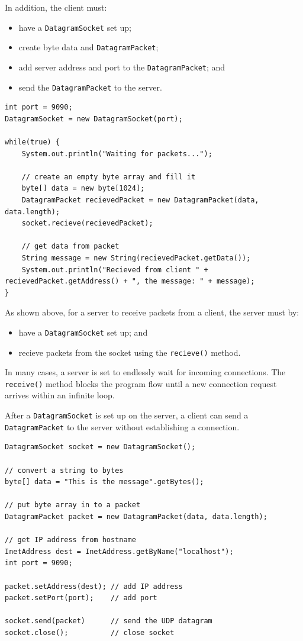 \documentclass[a4paper]{systems-software}
\begin{document}
In addition, the client must:
\begin{itemize}
	\item have a \texttt{DatagramSocket} set up;
	\item create byte data and \texttt{DatagramPacket};
	\item add server address and port to the \texttt{DatagramPacket}; and
	\item send the \texttt{DatagramPacket} to the server.
\end{itemize}


\begin{lstlisting}[title={Server: setting up a DatagramSocket and accepting packets.}]
int port = 9090;
DatagramSocket = new DatagramSocket(port);

while(true) {
	System.out.println("Waiting for packets...");
	
	// create an empty byte array and fill it
	byte[] data = new byte[1024];
	DatagramPacket recievedPacket = new DatagramPacket(data, data.length);
	socket.recieve(recievedPacket);
	
	// get data from packet
	String message = new String(recievedPacket.getData());
	System.out.println("Recieved from client " + recievedPacket.getAddress() + ", the message: " + message);
}
\end{lstlisting}

As shown above, for a server to receive packets from a client, the server must by:
\begin{itemize}
	\item have a \texttt{DatagramSocket} set up; and
	\item recieve packets from the socket using the \texttt{recieve()} method.
\end{itemize}

In many cases, a server is set to endlessly wait for incoming connections. The \texttt{receive()} method blocks the program flow until a new connection request arrives within an infinite loop.

After a \texttt{DatagramSocket} is set up on the server, a client can send a \texttt{DatagramPacket} to the server without establishing a connection.

\begin{lstlisting}[title={Client: sending a DatagramPacket to the server.}]
DatagramSocket socket = new DatagramSocket();

// convert a string to bytes
byte[] data = "This is the message".getBytes();

// put byte array in to a packet
DatagramPacket packet = new DatagramPacket(data, data.length);

// get IP address from hostname
InetAddress dest = InetAddress.getByName("localhost");
int port = 9090;

packet.setAddress(dest); // add IP address
packet.setPort(port);    // add port

socket.send(packet)      // send the UDP datagram
socket.close();          // close socket
\end{lstlisting}
\end{document}
